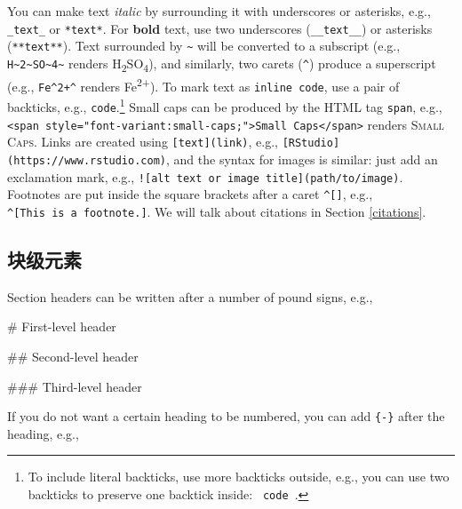 \documentclass[
  12pt,
]{krantz}
\newenvironment{Shaded}{\begin{snugshade}}{\end{snugshade}}
\newcommand{\FunctionTok}[1]{\textcolor[rgb]{0.00,0.00,0.00}{#1}}
\theoremstyle{definition}
\theoremstyle{definition}
\theoremstyle{definition}
\theoremstyle{definition}
\theoremstyle{remark}
\begin{document}
You can make text \emph{italic} by surrounding it with underscores or asterisks, e.g., \texttt{\_text\_} or \texttt{*text*}. For \textbf{bold} text, use two underscores (\texttt{\_\_text\_\_}) or asterisks (\texttt{**text**}). Text surrounded by \texttt{\textasciitilde{}} will be converted to a subscript (e.g., \texttt{H\textasciitilde{}2\textasciitilde{}SO\textasciitilde{}4\textasciitilde{}} renders H\textsubscript{2}SO\textsubscript{4}), and similarly, two carets (\texttt{\^{}}) produce a superscript (e.g., \texttt{Fe\^{}2+\^{}} renders Fe\textsuperscript{2+}). To mark text as \texttt{inline\ code}, use a pair of backticks, e.g., \texttt{\textasciigrave{}code\textasciigrave{}}.\footnote{To include literal backticks, use more backticks outside, e.g., you can use two backticks to preserve one backtick inside: \texttt{\textasciigrave{}\textasciigrave{}\ \textasciigrave{}code\textasciigrave{}\ \textasciigrave{}\textasciigrave{}}.} Small caps can be produced by the HTML tag \texttt{span}, e.g., \texttt{\textless{}span\ style="font-variant:small-caps;"\textgreater{}Small\ Caps\textless{}/span\textgreater{}} renders \textsc{Small Caps}. Links are created using \texttt{{[}text{]}(link)}, e.g., \texttt{{[}RStudio{]}(https://www.rstudio.com)}, and the syntax for images is similar: just add an exclamation mark, e.g., \texttt{!{[}alt\ text\ or\ image\ title{]}(path/to/image)}. Footnotes are put inside the square brackets after a caret \texttt{\^{}{[}{]}}, e.g., \texttt{\^{}{[}This\ is\ a\ footnote.{]}}. We will talk about citations in Section \ref{citations}.

\hypertarget{ux5757ux7ea7ux5143ux7d20}{%
\subsection{块级元素}\label{ux5757ux7ea7ux5143ux7d20}}

Section headers can be written after a number of pound signs, e.g.,

\begin{Shaded}
\begin{Highlighting}[]
\FunctionTok{\# First{-}level header}

\FunctionTok{\#\# Second{-}level header}

\FunctionTok{\#\#\# Third{-}level header}
\end{Highlighting}
\end{Shaded}

If you do not want a certain heading to be numbered, you can add \texttt{\{-\}} after the heading, e.g.,
\end{document}
